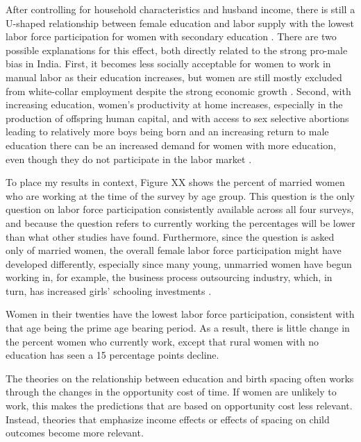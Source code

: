 After controlling for household characteristics and husband income, there is
still a U-shaped relationship between female education and labor supply with the
lowest labor force participation for women with secondary education \citep{Chatterjee2018}.
There are two possible explanations for this effect, both directly related to the strong
pro-male bias in India.
First, it becomes less socially acceptable for women to work in manual labor as their
education increases, but women are still mostly excluded from white-collar
employment despite the strong economic growth \citep{Klasen2015,Chatterjee2018}.
Second, with increasing education, women's productivity at home increases, especially
in the production of offspring human capital, and with access to sex selective abortions
leading to relatively more boys being born and an increasing return to male education 
there can be an increased demand for women with more education, even though they do not 
participate in the labor market \citep{Behrman1999}.


To place my results in context, Figure XX shows the percent of married women who are 
working at the time of the survey by age group.
This question is the only question on labor force participation consistently available 
across all four surveys, and because the question refers to currently working the 
percentages will be lower than what other studies have found.
Furthermore, since the question is asked only of married women, the overall female labor 
force participation might have developed differently, especially since many young, 
unmarried women have begun working in, for example, the business process 
outsourcing industry, which, in turn, has increased girls' schooling investments
\citep{Jensen2012}.

Women in their twenties have the lowest labor force participation, consistent with
that age being the prime age bearing period.
As a result, there is little change in the percent women who currently work, except
that rural women with no education has seen a 15 percentage points decline.




The theories on the relationship between education and birth spacing often works 
through the changes in the opportunity cost of time. 
If women are unlikely to work, this makes the predictions that are based on
opportunity cost less relevant. 
Instead, theories that emphasize income effects or effects of spacing on child
outcomes become more relevant. 

